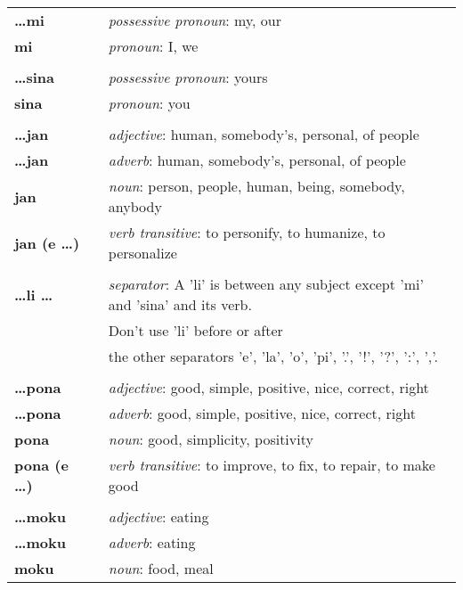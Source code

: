 \begin{supertabular}{p{2,5cm}|ll}
\textbf{\dots mi} && \textit{possessive pronoun}: my, our \\  %
\textbf{mi} && \textit{pronoun}: I, we  \\ %
 && \\ %
\textbf{\dots sina} && \textit{possessive pronoun}: yours \\  %
\textbf{sina} && \textit{pronoun}: you \\ %
 && \\ %
\textbf{\dots jan} && \textit{adjective}: human, somebody's, personal, of people \\ %
\textbf{\dots jan} && \textit{adverb}: human, somebody's, personal, of people \\ %
\textbf{jan} && \textit{noun}: person, people, human, being, somebody, anybody \\ %
\textbf{jan (e \dots)} && \textit{verb transitive}: to personify, to humanize, to personalize \\ %
 && \\ %
\textbf{\dots li \dots} && \textit{separator}: A 'li' is between any subject except 'mi' and 'sina' and its verb. \\ && Don't use 'li' before or after \\ && the other separators 'e', 'la', 'o', 'pi', '.', '!', '?', ':', ','. \\ %
 && \\ %
\textbf{\dots pona} && \textit{adjective}: good, simple, positive, nice, correct, right \\ %
\textbf{\dots pona} && \textit{adverb}: good, simple, positive, nice, correct, right \\ %
\textbf{pona} && \textit{noun}: good, simplicity, positivity \\ %
\textbf{pona (e \dots)} && \textit{verb transitive}: to improve, to fix, to repair, to make good \\ %
 && \\ %
\textbf{\dots moku} && \textit{adjective}: eating \\ %
\textbf{\dots moku} && \textit{adverb}: eating \\ %
\textbf{moku} && \textit{noun}: food, meal \\ %

\end{supertabular}
